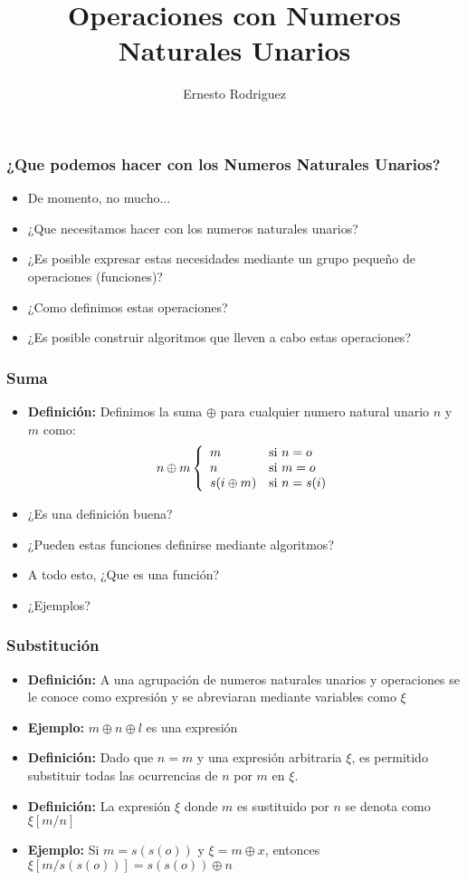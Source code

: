 \documentclass{beamer}
\title[Operaciones]{Operaciones con Numeros Naturales Unarios}
\author{Ernesto Rodriguez}
\institute{
    Universidad del Itsmo \\
    \medskip \textit{erodriguez@unis.edu.gt}
}
\date[\today]{}
\begin{document}
\begin{frame}
\titlepage
\end{frame}

\begin{frame}
    \frametitle{¿Que podemos hacer con los Numeros Naturales Unarios?}
    \begin{itemize}
        \item{De momento, no mucho...}
        \item{¿Que necesitamos hacer con los numeros naturales unarios?}
        \item{¿Es posible expresar estas necesidades mediante un grupo
        peque\~no de operaciones (funciones)?}
        \item{¿Como definimos estas operaciones?}
        \item{¿Es posible construir algoritmos que lleven a cabo estas operaciones?}
    \end{itemize}
\end{frame}

\begin{frame}
\frametitle{Suma}
\begin{itemize}
    \item{{\bf Definici\'on: }Definimos la suma $\oplus$ para cualquier numero
    natural unario $n$ y $m$ como:
    \[
        n\oplus m \left\{
        \begin{array}{l l}
            m & \mbox{si } n=o \\
            n & \mbox{si } m=o \\
            s(i\oplus m) & \mbox{si } n=s(i) \\
        \end{array}
        \right.
    \]
    }
    \item{¿Es una definici\'on buena?}
    \item{¿Pueden estas funciones definirse mediante algoritmos?}
    \item{A todo esto, ¿Que es una funci\'on?}
    \item{¿Ejemplos?}
\end{itemize}
\end{frame}

\begin{frame}
\frametitle{Substituci\'on}
\begin{itemize}
    \item{{\bf Definici\'on: }A una agrupaci\'on de numeros naturales unarios y
    operaciones se le conoce como expresi\'on y se abreviaran mediante variables como $\xi$}
    \item{{\bf Ejemplo: }$m\oplus n \oplus l$ es una expresi\'on}
    \item{{\bf Definici\'on: }Dado que $n=m$ y una expresi\'on arbitraria $\xi$,
    es permitido substituir todas las ocurrencias de $n$ por $m$ en $\xi$.}
    \item{{\bf Definici\'on: }La expresi\'on $\xi$ donde $m$ es sustituido por $n$
    se denota como $\xi[m \slash n]$}
    \item{{\bf Ejemplo: }Si $m=s(s(o))$ y $\xi=m\oplus x$, entonces $\xi[m \slash s(s(o))]=s(s(o))\oplus n$}
\end{itemize}
\end{frame}
\end{document}
